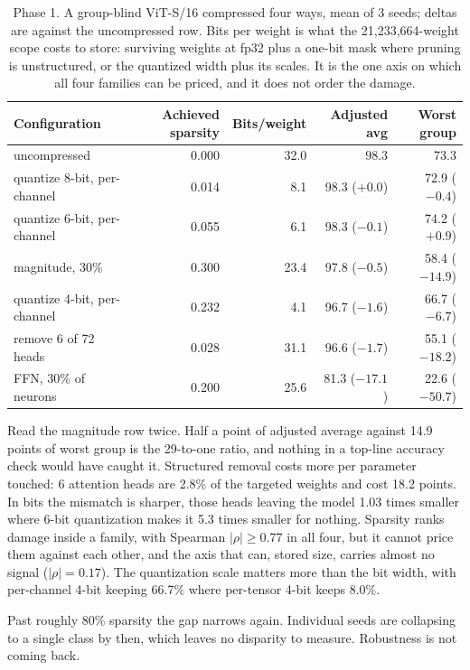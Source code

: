 \documentclass[11pt]{article}
\begin{document}
\begin{table}[t]
\centering
\small
\caption{Phase 1. A group-blind ViT-S/16 compressed four ways, mean of 3
seeds; deltas are against the uncompressed row. Bits per weight is what the
21{,}233{,}664-weight scope costs to store: surviving weights at fp32 plus a
one-bit mask where pruning is unstructured, or the quantized width plus its
scales. It is the one axis on which all four families can be priced, and it
does not order the damage.}
\label{tab:phase1}
\begin{tabular}{@{}lrrrr@{}}
\toprule
Configuration & Achieved sparsity & Bits/weight & Adjusted avg & Worst group \\
\midrule
uncompressed                & 0.000 & 32.0 & 98.3           & 73.3 \\
quantize 8-bit, per-channel & 0.014 & 8.1 & 98.3 ($+0.0$)  & 72.9 ($-0.4$) \\
quantize 6-bit, per-channel & 0.055 & 6.1 & 98.3 ($-0.1$)  & 74.2 ($+0.9$) \\
magnitude, 30\%             & 0.300 & 23.4 & 97.8 ($-0.5$)  & 58.4 ($\mathbf{-14.9}$) \\
quantize 4-bit, per-channel & 0.232 & 4.1 & 96.7 ($-1.6$)  & 66.7 ($-6.7$) \\
remove 6 of 72 heads        & 0.028 & 31.1 & 96.6 ($-1.7$)  & 55.1 ($\mathbf{-18.2}$) \\
FFN, 30\% of neurons        & 0.200 & 25.6 & 81.3 ($-17.1$) & 22.6 ($-50.7$) \\
\bottomrule
\end{tabular}
\end{table}

Read the magnitude row twice. Half a point of adjusted average against 14.9
points of worst group is the 29-to-one ratio, and nothing in a top-line
accuracy check would have caught it. Structured removal costs more per parameter touched: 6 attention heads are
2.8\% of the targeted weights and cost 18.2 points. In bits the mismatch is sharper, those heads leaving the
model 1.03 times smaller where 6-bit quantization makes it 5.3 times smaller
for nothing. Sparsity ranks damage inside a family, with Spearman $|\rho| \geq 0.77$ in all
four, but it cannot price them against each other, and the axis that can,
stored size, carries almost no signal ($|\rho| = 0.17$). The quantization scale matters more than the bit width, with
per-channel 4-bit keeping 66.7\% where per-tensor 4-bit keeps 8.0\%.

Past roughly 80\% sparsity the gap narrows again. Individual seeds are
collapsing to a single class by then, which leaves no disparity to measure.
Robustness is not coming back.
\end{document}
